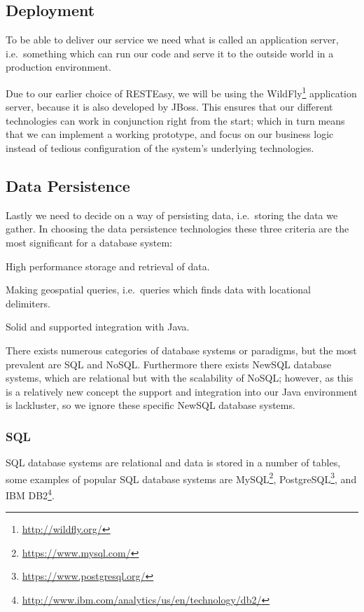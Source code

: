 \subsection{Deployment}
To be able to deliver our service we need what is called an application server, i.e.~something which can run our code and serve it to the outside world in a production environment.

Due to our earlier choice of RESTEasy, we will be using the WildFly\footnote{\url{http://wildfly.org/}} application server, because it is also developed by JBoss.
This ensures that our different technologies can work in conjunction right from the start;
which in turn means that we can implement a working prototype, and focus on our business logic instead of tedious configuration of the system's underlying technologies.

\subsection{Data Persistence}\label{subsec:datapersistence}
Lastly we need to decide on a way of persisting data, i.e.~storing the data we gather.
In choosing the data persistence technologies these three criteria are the most significant for a database system:
\begin{eletterate}
    \item High performance storage and retrieval of data.
    \item Making geospatial queries, i.e.~queries which finds data with locational delimiters.
    \item Solid and supported integration with Java.
\end{eletterate}


\bigskip
There exists numerous categories of database systems or paradigms, but the most prevalent are SQL and NoSQL.
Furthermore there exists NewSQL database systems, which are relational but with the scalability of NoSQL;
however, as this is a relatively new concept the support and integration into our Java environment is lackluster, so we ignore these specific NewSQL database systems.

\subsubsection*{SQL}

SQL database systems are relational and data is stored in a number of tables, some examples of popular SQL database systems are MySQL\footnote{\url{https://www.mysql.com/}}, PostgreSQL\footnote{\url{https://www.postgresql.org/}}, and IBM DB2\footnote{\url{http://www.ibm.com/analytics/us/en/technology/db2/}}.\cite{DB_RANKINGS}

